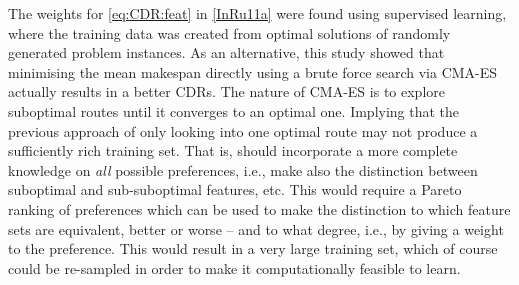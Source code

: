 The weights for \cref{eq:CDR:feat} in \cref{InRu11a} were found using 
supervised learning, where the training data was created from optimal solutions 
of randomly generated problem instances. As an alternative, this study showed  
that minimising the mean makespan directly using a brute force search via 
CMA-ES actually results in a better CDRs. The nature of CMA-ES is to explore 
suboptimal routes until it converges to an optimal one. Implying that the 
previous approach of only looking into one optimal route may not produce a 
sufficiently rich training set. That is, \PhiSet{\pi} should incorporate a 
more complete knowledge on \emph{all} possible preferences, i.e., make also the 
distinction between suboptimal and sub-suboptimal features, etc.  This would 
require a Pareto ranking of preferences which can be used to make the 
distinction to which feature sets are equivalent, better or worse -- and to 
what degree, i.e., by giving a weight to the preference. This would result in a 
very large training set, which of course could be re-sampled in order to make 
it computationally feasible to learn.

